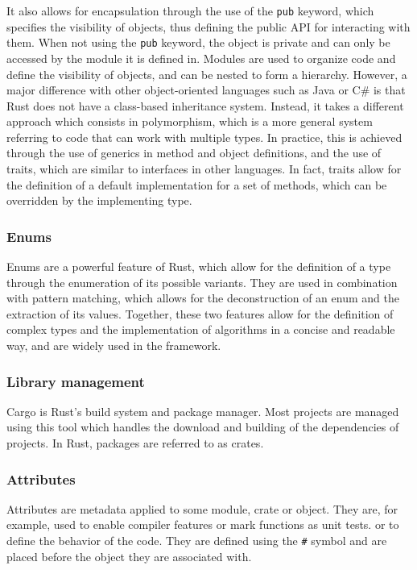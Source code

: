 It also allows for encapsulation through the use of the \texttt{pub} keyword, which specifies the visibility of objects, thus defining the public API for interacting
with them. When not using the \texttt{pub} keyword, the object is private and can only be accessed by the module it is defined in.
Modules are used to organize code and define the visibility of objects, and can be nested to form a hierarchy.
However, a major difference with other object-oriented languages such as Java or C\# is that Rust does not have a class-based inheritance system.
Instead, it takes a different approach which consists in polymorphism, which is a more general system referring to code that can work with multiple types.
In practice, this is achieved through the use of generics in method and object definitions, and the use of traits, which are similar to interfaces in other languages.
In fact, traits allow for the definition of a default implementation for a set of methods, which can be overridden by the implementing type.

\subsubsection{Enums}

Enums are a powerful feature of Rust, which allow for the definition of a type through the enumeration of its possible variants.
They are used in combination with pattern matching, which allows for the deconstruction of an enum and the extraction of its values.
Together, these two features allow for the definition of complex types and the implementation of algorithms in a concise and readable way, and are widely used in the
framework.

\subsubsection{Library management}

Cargo is Rust's build system and package manager. Most projects are managed using this tool which handles the download and building of the dependencies of projects.
In Rust, packages are referred to as crates.

\subsubsection{Attributes}

Attributes are metadata applied to some module, crate or object. They are, for example, used to enable compiler features or mark functions as unit tests.
or to define the behavior of the code. They are defined using the \texttt{\#} symbol and are placed before the object they are associated with.

